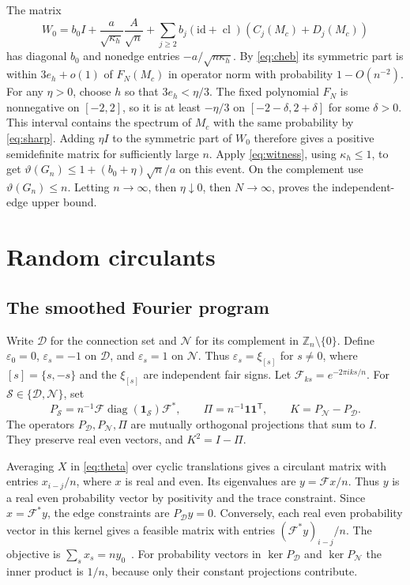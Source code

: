 \documentclass[11pt,letterpaper]{article}
\newcommand{\Z}{\mathbb Z}
\newcommand{\one}{\mathbf 1}
\begin{document}
The matrix
\[
 W_0=b_0 I+\frac{a}{\sqrt{\kappa_h}}\frac{A}{\sqrt n}
       +\sum_{j\ge2} b_j (\mathrm{id}+\operatorname{cl})(C_j(M_c)+D_j(M_c))
\]
has diagonal \(b_0\) and nonedge entries \(-a/\sqrt{n\kappa_h}\). By
\eqref{eq:cheb} its symmetric part is within \(3e_h+o(1)\) of
\(F_N(M_c)\) in operator norm with probability \(1-O(n^{-2})\).
For any \(\eta>0\), choose \(h\) so that \(3e_h<\eta/3\). The fixed
polynomial \(F_N\) is nonnegative on \([-2,2]\), so it is at least
\(-\eta/3\) on \([-2-\delta,2+\delta]\) for some \(\delta>0\). This
interval contains the spectrum of \(M_c\) with the same probability
by \eqref{eq:sharp}. Adding \(\eta I\) to the symmetric part of
\(W_0\) therefore gives a positive semidefinite matrix for sufficiently
large \(n\). Apply \eqref{eq:witness}, using \(\kappa_h\le1\), to get
\(\vartheta(G_n)\le 1+(b_0+\eta)\sqrt n/a\) on this event. On the
complement use \(\vartheta(G_n)\le n\). Letting \(n\to\infty\), then
\(\eta\downarrow0\), then \(N\to\infty\), proves the independent-edge
upper bound.

\section{Random circulants}\label{sec:circulant}

\subsection{The smoothed Fourier program}

Write \(\mathcal D\) for the connection set and \(\mathcal N\) for its
complement in \(\Z_n\setminus\{0\}\). Define \(\varepsilon_0=0\),
\(\varepsilon_s=-1\) on \(\mathcal D\), and \(\varepsilon_s=1\) on
\(\mathcal N\). Thus \(\varepsilon_s=\xi_{[s]}\) for \(s\ne0\), where
\([s]=\{s,-s\}\) and the \(\xi_{[s]}\) are independent fair signs.
Let \(\mathcal F_{ks}=e^{-2\pi i ks/n}\). For
\(\mathcal S\in\{\mathcal D,\mathcal N\}\), set
\[
 P_{\mathcal S}=n^{-1}\mathcal F\operatorname{diag}(\one_{\mathcal S})\mathcal F^*,
 \qquad \Pi=n^{-1}\one\one^{\mathsf T},\qquad K=P_{\mathcal N}-P_{\mathcal D}.
\]
The operators \(P_{\mathcal D},P_{\mathcal N},\Pi\) are mutually orthogonal
projections that sum to \(I\). They preserve real even vectors, and
\(K^2=I-\Pi\).

Averaging \(X\) in \eqref{eq:theta} over cyclic translations gives a
circulant matrix with entries \(x_{i-j}/n\), where \(x\) is real and even.
Its eigenvalues are \(y=\mathcal F x/n\). Thus \(y\) is a real even
probability vector by positivity and the trace constraint. Since
\(x=\mathcal F^*y\), the edge constraints are \(P_{\mathcal D}y=0\).
Conversely, each real even probability vector in this kernel gives a
feasible matrix with entries \((\mathcal F^*y)_{i-j}/n\).
The objective is \(\sum_s x_s=ny_0\)~\cite{BBDFKK}.
For probability vectors in \(\ker P_{\mathcal D}\) and
\(\ker P_{\mathcal N}\) the inner product is \(1/n\), because only
their constant projections contribute.
\end{document}
